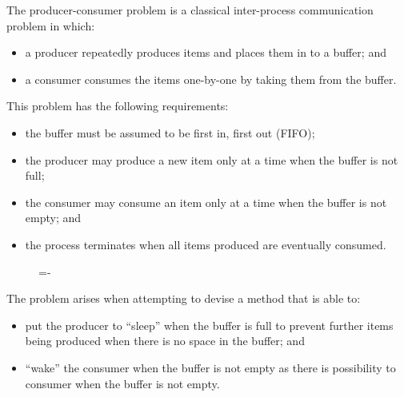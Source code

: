 \documentclass[a4paper]{systems-software}
\begin{document}
The producer-consumer problem is a classical inter-process communication problem in which:
\begin{itemize}
	\item a producer repeatedly produces items and places them in to a buffer; and
	\item a consumer consumes the items one-by-one by taking them from the buffer.
\end{itemize}

This problem has the following requirements:
\begin{itemize}
	\item the buffer must be assumed to be first in, first out (FIFO);
	\item the producer may produce a new item only at a time when the buffer is not full;
	\item the consumer may consume an item only at a time when the buffer is not empty; and
	\item the process terminates when all items produced are eventually consumed.
\end{itemize}

\begin{figure}[H]
  \lineskip=-\fboxrule
\end{figure}

The problem arises when attempting to devise a method that is able to:
\begin{itemize}
	\item put the producer to “sleep” when the buffer is full to prevent further items being produced when there is no space in the buffer; and
	\item “wake” the consumer when the buffer is not empty as there is possibility to consumer when the buffer is not empty.
\end{itemize}
\end{document}
